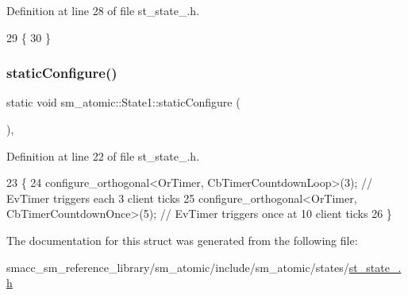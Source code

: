 Definition at line 28 of file st\+\_\+state\+\_.\+h.


\begin{DoxyCode}
29     \{
30     \}
\end{DoxyCode}
\mbox{\label{structsm__atomic_1_1State1_a299adfad0ff1e2c592c319e1fa5de114}} 
\subsubsection{\texorpdfstring{static\+Configure()}{staticConfigure()}}
{\footnotesize\ttfamily static void sm\+\_\+atomic\+::\+State1\+::static\+Configure (\begin{DoxyParamCaption}{ }\end{DoxyParamCaption})\hspace{0.3cm}{\ttfamily [inline]}, {\ttfamily [static]}}



Definition at line 22 of file st\+\_\+state\+\_.\+h.


\begin{DoxyCode}
23     \{
24         configure\_orthogonal<OrTimer, CbTimerCountdownLoop>(3);  \textcolor{comment}{// EvTimer triggers each 3 client ticks}
25         configure\_orthogonal<OrTimer, CbTimerCountdownOnce>(5); \textcolor{comment}{// EvTimer triggers once at 10 client ticks}
26     \}
\end{DoxyCode}


The documentation for this struct was generated from the following file\+:\begin{DoxyCompactItemize}
\item 
smacc\+\_\+sm\+\_\+reference\+\_\+library/sm\+\_\+atomic/include/sm\+\_\+atomic/states/\hyperlink{sm__atomic_2include_2sm__atomic_2states_2st__state__1_8h}{st\+\_\+state\+\_.\+h}\end{DoxyCompactItemize}
